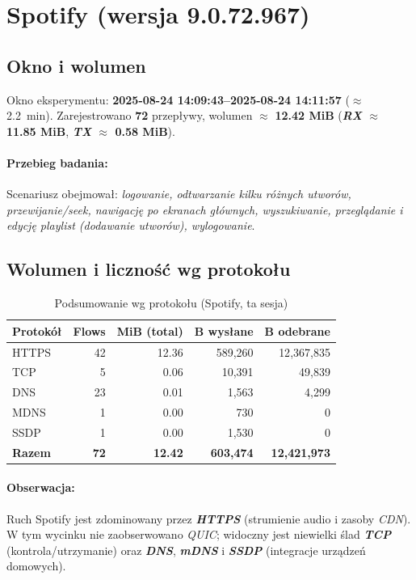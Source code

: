 \section{Spotify (wersja 9.0.72.967)}
\label{sec:spotify}

\subsection*{Okno i wolumen}
Okno eksperymentu: \textbf{2025-08-24 14{:}09{:}43–2025-08-24 14{:}11{:}57} ($\approx$ \SI{2.2}{\minute}). 
Zarejestrowano \textbf{72} przepływy, wolumen $\approx$ \textbf{12.42 MiB} 
(\textbf{\emph{RX} $\approx$ 11.85 MiB}, \textbf{\emph{TX} $\approx$ 0.58 MiB}).

\paragraph{Przebieg badania:} 
Scenariusz obejmował: \emph{logowanie, odtwarzanie kilku różnych utworów, przewijanie/\emph{seek}, nawigację po ekranach głównych, wyszukiwanie, przeglądanie i edycję playlist (dodawanie utworów), wylogowanie}.

\subsection{Wolumen i liczność wg protokołu}
\begin{table}[H]
  \centering
  \caption{Podsumowanie wg protokołu (Spotify, ta sesja)}
  \label{tab:spotify-proto}
  \begin{tabular}{lrrrr}
    \toprule
    \textbf{Protokół} & \textbf{Flows} & \textbf{MiB (total)} & \textbf{B wysłane} & \textbf{B odebrane} \\
    \midrule
    HTTPS & 42 & 12.36 & 589{,}260 & 12{,}367{,}835 \\
    TCP   & 5  & 0.06  & 10{,}391  & 49{,}839 \\
    DNS   & 23 & 0.01  & 1{,}563   & 4{,}299 \\
    MDNS  & 1  & 0.00  & 730       & 0 \\
    SSDP  & 1  & 0.00  & 1{,}530   & 0 \\
    \midrule
    \textbf{Razem} & \textbf{72} & \textbf{12.42} & \textbf{603{,}474} & \textbf{12{,}421{,}973} \\
    \bottomrule
  \end{tabular}
\end{table}

\paragraph{Obserwacja:} 
Ruch Spotify jest zdominowany przez \textbf{\emph{HTTPS}} (strumienie audio i zasoby \emph{CDN}). W tym wycinku nie zaobserwowano \emph{QUIC}; widoczny jest niewielki ślad \textbf{\emph{TCP}} (kontrola/utrzymanie) oraz \textbf{\emph{DNS}}, \textbf{\emph{mDNS}} i \textbf{\emph{SSDP}} (integracje urządzeń domowych).

